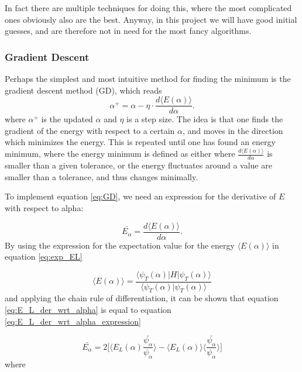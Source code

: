 In fact there are multiple techniques for doing this, where the most complicated ones obviously also are the best. Anyway, in this project we will have good initial guesses, and are therefore not in need for the most fancy algorithms. 

\subsubsection{Gradient Descent} \label{sec:gd}
Perhaps the simplest and most intuitive method for finding the minimum is the gradient descent method (GD), which reads
\begin{equation}
\label{eq:GD}
\alpha^+=\alpha - \eta\cdot\frac{d\langle E(\alpha)\rangle}{d\alpha}.
\end{equation}
where $\alpha^+$ is the updated $\alpha$ and $\eta$ is a step size. The idea is that one finds the gradient of the energy with respect to a certain $\alpha$, and moves in the direction which minimizes the energy. This is repeated until one has found an energy minimum, where the energy minimum is defined as either where $\frac{d\langle E(\alpha)\rangle}{d\alpha}$ is smaller than a given tolerance, or the energy fluctuates around a value are smaller than a tolerance, and thus changes minimally.
\par 
\vspace{3mm}

To implement equation \ref{eq:GD}, we need an expression for the derivative of $E$ with respect to alpha:

\begin{equation}
	\label{eq:E_L_der_wrt_alpha}
	\bar{E_{\alpha}} = \frac{d \langle E (\alpha) \rangle}{d \alpha}.
\end{equation}
By using the expression for the expectation value for the energy $ \langle E (\alpha) \rangle$ in equation \ref{eq:exp_EL} 

\begin{equation}
	\label{eq:exp_EL}
	\langle E (\alpha) \rangle = \frac{ \langle \psi_T(\alpha) | H | \psi_T(\alpha)  \rangle}{ \langle \psi_T(\alpha)  |  \psi_T(\alpha)  \rangle }
\end{equation}
and applying the chain rule of differentiation, it can be shown that equation \ref{eq:E_L_der_wrt_alpha} is equal to equation \ref{eq:E_L_der_wrt_alpha_expression}

\begin{equation}
	\label{eq:E_L_der_wrt_alpha_expression}
	\bar{E_{\alpha}} = 2 \bigg[\langle E_L (\alpha)  \frac{ \bar{\psi_{\alpha}}}{\psi_{\alpha}}\rangle - \langle E_L (\alpha) \rangle \langle \frac{\bar{\psi_{\alpha}}}{\psi_{\alpha}} \rangle\bigg]
\end{equation}
where

